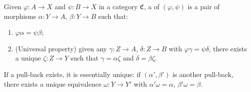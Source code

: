 Given $\varphi: A \to X$ and $\psi: B \to X$ in a category $\mathfrak{C}$, a  of $(\varphi, \psi)$ is a pair of morphisms $\alpha: Y \to A$, $\beta: Y \to B$ such that:
\begin{enumerate}
\item[(i)] $\varphi \alpha = \psi \beta$;
\item[(ii)] (Universal property) given any $\gamma: Z \to A$, $\delta: Z \to B$ with $\varphi \gamma = \psi \delta$, there exists a unique $\zeta: Z \to Y$ such that $\gamma = \alpha \zeta$ and $\delta = \beta \zeta$.
\end{enumerate}
If a pull-back exists, it is essentially unique: if $(\alpha', \beta')$ is another pull-back, there exists a unique equivalence $\omega: Y \to Y'$ with $\alpha' \omega = \alpha$, $\beta' \omega = \beta$.
